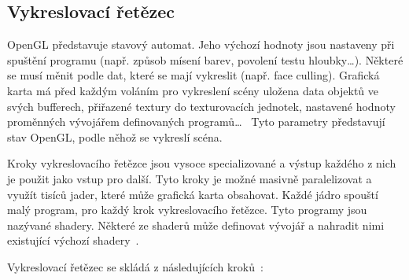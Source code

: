 \documentclass[thesis=M,czech]{FITthesis}[2019/12/23]
\begin{document}
\subsection{Vykreslovací řetězec}
OpenGL představuje stavový automat. Jeho výchozí hodnoty jsou nastaveny při spuštění programu (např. způsob mísení barev, povolení testu hloubky\dots). Některé se musí měnit podle dat, které se mají vykreslit (např. face culling). Grafická karta má před každým voláním pro vykreslení scény uložena data objektů ve svých bufferech, přiřazené textury do texturovacích jednotek, nastavené hodnoty proměnných vývojářem definovaných programů\dots~ Tyto parametry představují stav OpenGL, podle něhož se vykreslí scéna.

Kroky vykreslovacího řetězce jsou vysoce specializované a výstup každého z nich je použit jako vstup pro další. Tyto kroky je možné masivně paralelizovat a využít tisíců jader, které může grafická karta obsahovat. Každé jádro spouští malý program, pro každý krok vykreslovacího řetězce. Tyto programy jsou nazývané shadery. Některé ze shaderů může definovat vývojář a nahradit nimi existující výchozí shadery~\cite{lopgl_triangle}.

Vykreslovací řetězec se skládá z následujících kroků~\cite{kronos_render}: 
\end{document}
